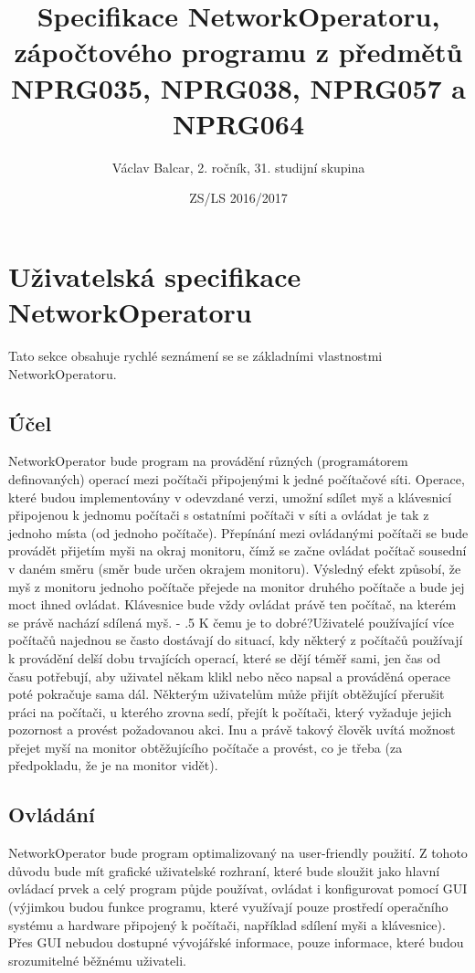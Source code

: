 \documentclass[12pt]{article}
\title{Specifikace NetworkOperatoru, zápočtového programu z předmětů NPRG035, NPRG038, NPRG057 a NPRG064}
\date{ZS/LS 2016/2017}
\author{Václav Balcar, 2. ročník, 31. studijní skupina}
\makeatletter
\renewcommand\paragraph{%
    \@startsection{paragraph}{4}{0mm}%
       {-\baselineskip}%
       {.5\baselineskip}%
       {\normalfont\normalsize\bfseries}}
\makeatother
\begin{document}
\maketitle
\newpage
{}
\tableofcontents
\newpage

\section{Uživatelská specifikace NetworkOperatoru}
Tato sekce obsahuje rychlé seznámení se se základními vlastnostmi NetworkOperatoru.
\subsection{Účel} 
NetworkOperator bude program na provádění různých (programátorem definovaných) operací mezi počítači připojenými k jedné počítačové síti. Operace, které budou implementovány v odevzdané verzi, umožní sdílet myš a klávesnicí připojenou k jednomu počítači s ostatními počítači v síti a ovládat je tak z jednoho místa (od jednoho počítače). Přepínání mezi ovládanými počítači se bude provádět přijetím myši na okraj monitoru, čímž se začne ovládat počítač sousední v daném směru (směr bude určen okrajem monitoru). Výsledný efekt způsobí, že myš z monitoru jednoho počítače přejede na monitor druhého počítače a bude jej moct ihned ovládat. Klávesnice bude vždy ovládat právě ten počítač, na kterém se právě nachází sdílená myš.
\paragraph{K čemu je to dobré?}Uživatelé používající více počítačů najednou se často dostávají do situací, kdy některý z počítačů používají k provádění delší dobu trvajících operací, které se dějí téměř sami, jen čas od času potřebují, aby uživatel někam klikl nebo něco napsal a prováděná operace poté pokračuje sama dál. Některým uživatelům může přijít obtěžující přerušit práci na počítači, u kterého zrovna sedí, přejít k počítači, který vyžaduje jejich pozornost a provést požadovanou akci. Inu a právě takový člověk uvítá možnost přejet myší na monitor obtěžujícího počítače a provést, co je třeba (za předpokladu, že je na monitor vidět).

\subsection{Ovládání}
NetworkOperator bude program optimalizovaný na user-friendly použití. Z tohoto důvodu bude mít grafické uživatelské rozhraní, které bude sloužit jako hlavní ovládací prvek a celý program půjde používat, ovládat i konfigurovat pomocí GUI (výjimkou budou funkce programu, které využívají pouze prostředí operačního systému a hardware připojený k počítači, například sdílení myši a klávesnice). Přes GUI nebudou dostupné vývojářské informace, pouze informace, které budou srozumitelné běžnému uživateli.
\end{document}
